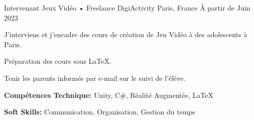 

\begin{cventries}

  \cventry
    {Intervenant Jeux Vidéo • Freelance} %
    {DigiActivity} %
    {Paris, France} %
    {À partir de Juin 2023} %
    {
      \begin{cvitems} %
        \item {J'interviens et j'encadre des cours de création de Jeu Vidéo à des adolescents à Paris.}
        \item {Préparation des cours sous LaTeX.}
        \item{Tenir les parents informés par e-mail sur le suivi de l'élève.}
        \item {\textbf{Compétences Technique:} Unity, C\#, Réalité Augmentée, LaTeX}
        \item {\textbf{Soft Skills:} Communication, Organisation, Gestion du temps}
      \end{cvitems}
    }


\end{cventries}
